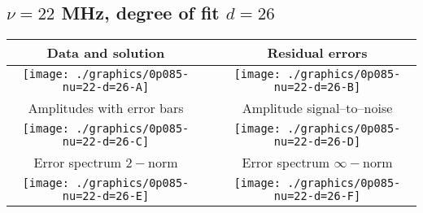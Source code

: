 

% 

\clearpage{}
\break{}

\subsection{$\nu = 22$ MHz, degree of fit $d = 26$}

\begin{table}[h]
    \begin{center}
        \begin{tabular}{ccc}
            Data and solution & \quad & Residual errors \\\hline
            \texttt{[image: ./graphics/0p085-nu=22-d=26-A]} &&
            \texttt{[image: ./graphics/0p085-nu=22-d=26-B]} \\[15pt]
            Amplitudes with error bars && Amplitude signal--to--noise \\\hline
            \texttt{[image: ./graphics/0p085-nu=22-d=26-C]} &&
            \texttt{[image: ./graphics/0p085-nu=22-d=26-D]} \\[15pt]
            Error spectrum $2-$norm && Error spectrum $\infty-$norm \\\hline
            \texttt{[image: ./graphics/0p085-nu=22-d=26-E]} &&
            \texttt{[image: ./graphics/0p085-nu=22-d=26-F]} \\[15pt]
        \end{tabular}
    \end{center}
\label{fig:elev=85, nu=22}
\end{table}



\endinput
